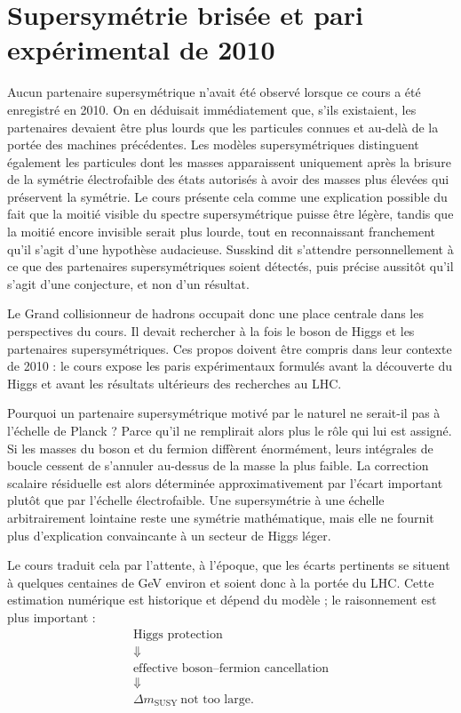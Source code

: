 \section{Supersymétrie brisée et pari expérimental de 2010}

Aucun partenaire supersymétrique n’avait été observé lorsque ce cours a été enregistré en 2010. On en déduisait immédiatement que, s’ils existaient, les partenaires devaient être plus lourds que les particules connues et au-delà de la portée des machines précédentes. Les modèles supersymétriques distinguent également les particules dont les masses apparaissent uniquement après la brisure de la symétrie électrofaible des états autorisés à avoir des masses plus élevées qui préservent la symétrie. Le cours présente cela comme une explication possible du fait que la moitié visible du spectre supersymétrique puisse être légère, tandis que la moitié encore invisible serait plus lourde, tout en reconnaissant franchement qu’il s’agit d’une hypothèse audacieuse. Susskind dit s’attendre personnellement à ce que des partenaires supersymétriques soient détectés, puis précise aussitôt qu’il s’agit d’une conjecture, et non d’un résultat.

Le Grand collisionneur de hadrons occupait donc une place centrale dans les perspectives du cours. Il devait rechercher à la fois le boson de Higgs et les partenaires supersymétriques. Ces propos doivent être compris dans leur contexte de 2010 : le cours expose les paris expérimentaux formulés avant la découverte du Higgs et avant les résultats ultérieurs des recherches au LHC.

Pourquoi un partenaire supersymétrique motivé par le naturel ne serait-il pas à l’échelle de Planck ? Parce qu’il ne remplirait alors plus le rôle qui lui est assigné. Si les masses du boson et du fermion diffèrent énormément, leurs intégrales de boucle cessent de s’annuler au-dessus de la masse la plus faible. La correction scalaire résiduelle est alors déterminée approximativement par l’écart important plutôt que par l’échelle électrofaible. Une supersymétrie à une échelle arbitrairement lointaine reste une symétrie mathématique, mais elle ne fournit plus d’explication convaincante à un secteur de Higgs léger.

Le cours traduit cela par l’attente, à l’époque, que les écarts pertinents se situent à quelques centaines de GeV environ et soient donc à la portée du LHC. Cette estimation numérique est historique et dépend du modèle ; le raisonnement est plus important :
\begin{equation}
\begin{gathered}
\text{Higgs protection}\\
\Downarrow\\
\text{effective boson--fermion cancellation}\\
\Downarrow\\
\Delta m_{\mathrm{SUSY}}\ \text{not too large}.
\end{gathered}
\end{equation}

